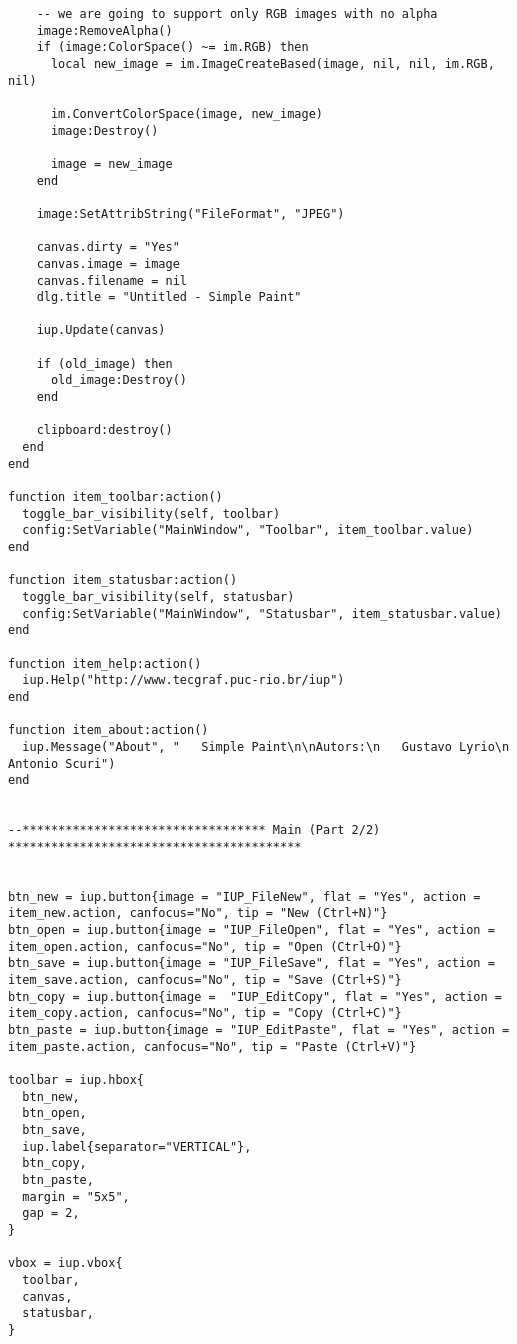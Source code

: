\documentclass{ctexart}
\begin{document}
\begin{lstlisting}
    -- we are going to support only RGB images with no alpha
    image:RemoveAlpha()
    if (image:ColorSpace() ~= im.RGB) then
      local new_image = im.ImageCreateBased(image, nil, nil, im.RGB, nil)        

      im.ConvertColorSpace(image, new_image)
      image:Destroy()

      image = new_image
    end

    image:SetAttribString("FileFormat", "JPEG")

    canvas.dirty = "Yes"
    canvas.image = image
    canvas.filename = nil
    dlg.title = "Untitled - Simple Paint"

    iup.Update(canvas)

    if (old_image) then
      old_image:Destroy()
    end

    clipboard:destroy()
  end
end

function item_toolbar:action()
  toggle_bar_visibility(self, toolbar)
  config:SetVariable("MainWindow", "Toolbar", item_toolbar.value)
end

function item_statusbar:action()
  toggle_bar_visibility(self, statusbar)
  config:SetVariable("MainWindow", "Statusbar", item_statusbar.value)
end

function item_help:action()
  iup.Help("http://www.tecgraf.puc-rio.br/iup")
end

function item_about:action()
  iup.Message("About", "   Simple Paint\n\nAutors:\n   Gustavo Lyrio\n   Antonio Scuri")
end


--********************************** Main (Part 2/2) *****************************************


btn_new = iup.button{image = "IUP_FileNew", flat = "Yes", action = item_new.action, canfocus="No", tip = "New (Ctrl+N)"}
btn_open = iup.button{image = "IUP_FileOpen", flat = "Yes", action = item_open.action, canfocus="No", tip = "Open (Ctrl+O)"}
btn_save = iup.button{image = "IUP_FileSave", flat = "Yes", action = item_save.action, canfocus="No", tip = "Save (Ctrl+S)"}
btn_copy = iup.button{image =  "IUP_EditCopy", flat = "Yes", action = item_copy.action, canfocus="No", tip = "Copy (Ctrl+C)"}
btn_paste = iup.button{image = "IUP_EditPaste", flat = "Yes", action = item_paste.action, canfocus="No", tip = "Paste (Ctrl+V)"}

toolbar = iup.hbox{
  btn_new,
  btn_open,
  btn_save,
  iup.label{separator="VERTICAL"},
  btn_copy,
  btn_paste,
  margin = "5x5",
  gap = 2,
}

vbox = iup.vbox{
  toolbar,
  canvas,
  statusbar,
}


\end{lstlisting}
\end{document}
